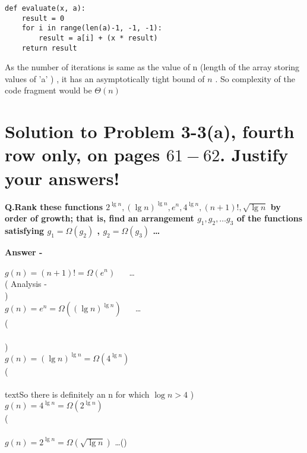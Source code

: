 \documentclass[5pt]{article}
\begin{document}
\begin{lstlisting}
def evaluate(x, a):
    result = 0
    for i in range(len(a)-1, -1, -1):
        result = a[i] + (x * result)
    return result
\end{lstlisting}

As the number of iterations is same as the value of n (length of the array storing values of 'a' ) , it has an asymptotically tight bound of $n$ . So complexity of the code fragment would be $\Theta(n)$ 

\section{Solution to Problem 3-3(a), fourth row only, on pages $61-62$. Justify your answers!}
\textbf{Q.Rank these functions $2^{\lg n} , (\lg n)^{\lg n}, e^n , 4^{\lg n}, (n+1)!, \sqrt{\lg n} $ by order of growth; that is, find an arrangement $g_1, g_2, \dots g_3$ of the functions satisfying  $ g_1 = \Omega(g_2)$ ,  $g_2 = \Omega(g_3) $ \dots}

\setlength{\parskip}{1.2em}
\setlength{\parindent}{0em}

\textbf{Answer -}


 $ g(n) = (n+1)! =  \Omega(e^n) $  ~~ \dots \\
 ( Analysis -  \\
 ) \\
 
 $g(n) = e^n = \Omega( (\lg n)^{\lg n} ) $ ~~ \dots \\
  ( \\
  \\
  )\\
 $ g(n) = (\lg n)^{\lg n} = \Omega( 4^{\lg n} )  $ \\
  (\\
  \\text{So there is definitely an n for which $\log n > 4$ })\\
 $ g(n) = 4^{\lg n} = \Omega( 2^{\lg n} ) $ \\ 
 (\\
  \\
$ g(n) = 2^{\lg n} = \Omega(\sqrt{\lg n})  $  \dots ()
\end{document}
